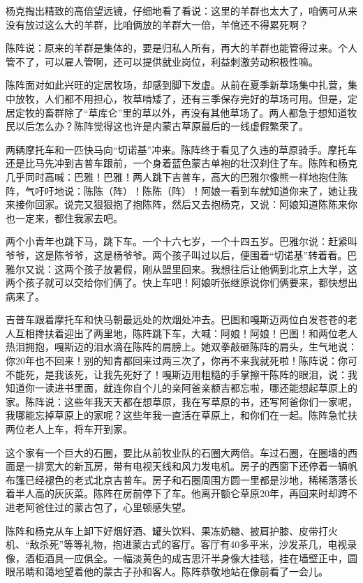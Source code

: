 \par 杨克掏出精致的高倍望远镜，仔细地看了看说：这里的羊群也太大了，咱俩可从来没有放过这么大的羊群，比咱俩放的羊群大一倍，羊倌还不得累死啊？
\par 陈阵说：原来的羊群是集体的，要是归私人所有，再大的羊群也能管得过来。个人管不了，可以雇人管啊，还可以提供就业岗位，利益刺激劳动积极性嘛。
\par 陈阵面对如此兴旺的定居牧场，却感到脚下发虚。从前在夏季新草场集中扎营，集中放牧，人们都不用担心，牧草啃矮了，还有三季保存完好的草场可用。但是，定居定牧的畜群除了“草库仑”里的草以外，再没有其他草场了。两人都急于想知道牧民以后怎么办？陈阵觉得这也许是内蒙古草原最后的一线虚假繁荣了。
\par 两辆摩托车和一匹快马向“切诺基”冲来。陈阵终于看见了久违的草原骑手。摩托车还是比马先冲到吉普车跟前，一个身着蓝色蒙古单袍的壮汉刹住了车。陈阵和杨克几乎同时高喊：巴雅！巴雅！两人跳下吉普车，高大的巴雅尔像熊一样地抱住陈阵，气吁吁地说：陈陈（阵）！陈陈（阵）！阿娘一看到车就知道你来了，她让我来接你回家。说完又狠狠抱了抱陈阵，然后又去抱杨克，又说：阿娘知道陈陈来你也一定来，都住我家去吧。
\par 两个小青年也跳下马，跳下车。一个十六七岁，一个十四五岁。巴雅尔说：赶紧叫爷爷，这是陈爷爷，这是杨爷爷。两个孩子叫过以后，便围着“切诺基”转着看。巴雅尔又说：这两个孩子放暑假，刚从盟里回来。我想往后让他俩到北京上大学，这两个孩子就可以交给你们俩了。快上车吧！阿娘听张继原说你们俩要来，都快想出病来了。
\par 吉普车跟着摩托车和快马朝最远处的炊烟处冲去。巴图和嘎斯迈两位白发苍苍的老人互相搀扶着迎出了两里地，陈阵跳下车，大喊：阿娘！阿娘！巴图！和两位老人热泪拥抱，嘎斯迈的泪水滴在陈阵的肩膀上。她双拳敲砸陈阵的肩头，生气地说：你20年也不回来！别的知青都回来过两三次了，你再不来我就死啦！陈阵说：你可不能死，是我该死，让我先死好了！嘎斯迈用粗糙的手掌擦干陈阵的眼泪，说：我知道你一读进书里面，就连你自个儿的亲阿爸亲额吉都忘啦，哪还能想起草原上的家。陈阵说：这些年我天天都在想草原，我在写草原的书，还写阿爸你们一家呢，我哪能忘掉草原上的家呢？这些年我一直活在草原上，和你们在一起。陈阵急忙扶两位老人上车，将车开到家。
\par 这个家有一个巨大的石圈，要比从前牧业队的石圈大两倍。车过石圈，在圈墙的西面是一排宽大的新瓦房，带有电视天线和风力发电机。房子的西窗下还停着一辆帆布篷已经褪色的老式北京吉普车。房子和石圈周围方圆一里都是沙地，稀稀落落长着半人高的灰灰菜。陈阵在房前停下了车。他离开额仑草原20年，再回来时却跨不进老阿爸住过的蒙古包了，心里顿感失望。
\par 陈阵和杨克从车上卸下好烟好酒、罐头饮料、果冻奶糖、披肩护膝、皮带打火机、“敌杀死”等等礼物，抱进蒙古式的客厅。客厅有40多平米，沙发茶几，电视录像，酒柜酒具一应俱全。一幅淡黄色的成吉思汗半身像大挂毯，挂在墙壁正中，圆眼吊睛和蔼地望着他的蒙古子孙和客人。陈阵恭敬地站在像前看了一会儿。
